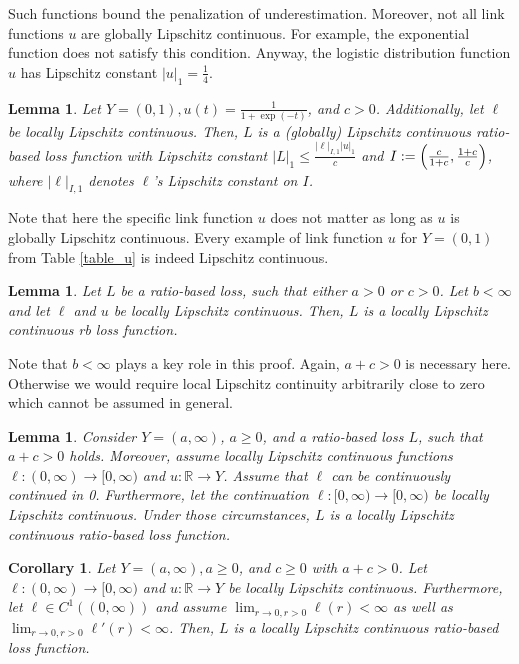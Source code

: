 \documentclass[10pt]{article}
\newcommand{\R}{\mathbb{R}}
\newtheorem{lemma}[theorem]{Lemma}
\newtheorem{corollary}[theorem]{Corollary}
\begin{document}
Such functions bound the penalization of underestimation.
Moreover, not all link functions $u$ are globally Lipschitz continuous.
For example, the exponential function does not satisfy this condition.
Anyway, the logistic distribution function $u$ has Lipschitz constant $|u|_1 = \frac{1}{4}$. 
\begin{lemma} \label{LipschitzY01}
	Let $Y = (0,1), u(t) = \frac{1}{1+\exp(-t)}$, and $c > 0$. Additionally, let $\ell$ be locally Lipschitz continuous.
	Then, $L$ is a (globally) Lipschitz continuous ratio-based loss function with Lipschitz constant $|L|_1 \leq \frac{|\ell|_{I,1}|u|_1}{c}$ and $I := \Bigl(\frac{c}{1+c}, \frac{1+c}{c}\Bigr)$, where $|\ell|_{I,1}$ denotes $\ell$'s Lipschitz constant on $I$.
\end{lemma}
Note that here the specific link function $u$ does not matter as long as $u$ is globally Lipschitz continuous. 
Every example of link function $u$ for $Y = (0,1)$ from Table \ref{table_u} is indeed Lipschitz continuous.
\begin{lemma} \label{LocalLipschitzL}
	Let $L$ be a ratio-based loss, such that either $a > 0$ or $c > 0$. Let $b < \infty$ and  let $\ell$ and $u$ be locally Lipschitz continuous. 
	Then, $L$ is a locally Lipschitz continuous rb loss function.
\end{lemma}
Note that $b < \infty$ plays a key role in this proof.
Again, $a +c >0$ is necessary here.
Otherwise we would require local Lipschitz continuity arbitrarily close to zero which cannot be assumed in general.
\begin{lemma} \label{LocalLipschitzL2}
	Consider $Y = (a, \infty)$, $a \geq 0$, and a ratio-based loss $L$, such that $a + c > 0$ holds. 
	Moreover, assume locally Lipschitz continuous functions $\ell: (0, \infty) \to [0, \infty)$ and $u: \R \to Y$. 
	Assume that $\ell$ can be continuously continued in 0. 
	Furthermore, let the continuation $\ell: [0, \infty) \to [0, \infty)$ be locally Lipschitz continuous.
	Under those circumstances, $L$ is a locally Lipschitz continuous ratio-based loss function.
\end{lemma}
\begin{corollary}
	Let $Y = (a,\infty), a \geq 0$, and $c \geq 0$ with $a+c>0$. 
	Let $\ell: (0, \infty) \to [0, \infty)$ and $u: \R \to Y$ be locally Lipschitz continuous.
	Furthermore, let $\ell \in C^1((0, \infty))$ and assume $\lim_{r \to 0, r > 0}\ell(r) < \infty$ as well as $\lim_{r \to 0, r > 0} \ell'(r) < \infty$. 
	Then, $L$ is a locally Lipschitz continuous ratio-based loss function.
\end{corollary}
\end{document}
